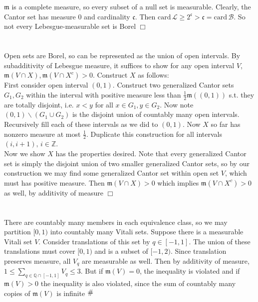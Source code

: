 \documentclass{article}
\newcommand{\contra}{\raisebox{\depth}{\#}}
\begin{document}
\section{}
$\mathfrak{m}$ is a complete measure, so every subset of a null set is measurable. Clearly, the Cantor set has measure 0 and cardinality $\mathfrak{c}$. Then $\textrm{card}\, \mathcal{L} \geq 2^{\mathfrak{c}} > \mathfrak{c} = \textrm{card}\, \mathcal{B}$. So not every Lebesgue-measurable set is Borel $\Box$

\section{}
Open sets are Borel, so can be represented as the union of open intervals. By subadditivity of Lebesgue measure, it suffices to show for any open interval $V$, $\mathfrak{m}(V\cap X), \mathfrak{m}(V\cap X^c) > 0$. Construct $X$ as follows:\\
First consider open interval $(0,1)$. Construct two generalized Cantor sets $G_1, G_2$ within the interval with positive measure less than $\frac{1}{2}\mathfrak{m}((0,1))$ s.t. they are totally disjoint, i.e. $x<y$ for all $x\in G_1, y\in G_2$. Now note $(0,1) \backslash (G_1 \cup G_2)$ is the disjoint union of countably many open intervals. Recursively fill each of these intervals as we did to $(0,1)$. Now $X$ so far has nonzero measure at most $\frac{1}{2}$. Duplicate this construction for all intervals $(i,i+1), \, i \in \mathbb{Z}$.\\
Now we show $X$ has the properties desired. Note that every generalized Cantor set is simply the disjoint union of two smaller generalized Cantor sets, so by our construction we may find some generalized Cantor set within open set $V$, which must has positive measure. Then $\mathfrak{m}(V\cap X) > 0$ which implies $\mathfrak{m}(V\cap X^c) > 0$ as well, by additivity of measure $\Box$

\section{}
There are countably many members in each equivalence class, so we may partition $[0,1)$ into countably many Vitali sets. Suppose there is a measurable Vitali set $V$. Consider translations of this set by $q \in [-1,1]$. The union of these translations must cover $[0,1)$ and is a subset of $[-1,2)$. Since translation preserves measure, all $V_q$ are measurable as well. Then by additivity of measure, $1 \leq \sum\limits_{q \in \mathbb{Q}\cap[-1,1]} V_q \leq 3$. But if $\mathfrak{m}(V) = 0$, the inequality is violated and if $\mathfrak{m}(V) > 0$ the inequality is also violated, since the sum of countably many copies of $\mathfrak{m}(V)$ is infinite $\contra$
\end{document}
